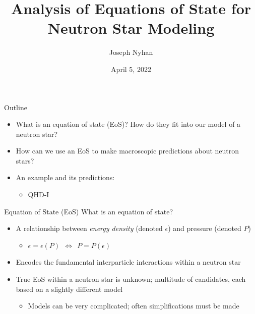 \documentclass[handout]{beamer}
\title[Analysis of Equations of State]{Analysis of Equations of State for Neutron Star Modeling}
\author{Joseph Nyhan}
\date{April 5, 2022}
\institute{College of the Holy Cross}
\begin{document}
    \maketitle

    \begin{frame}{Outline}
        \pause
        \begin{itemize}
            \item What is an equation of state (EoS)? \pause How do they fit into our model of a neutron star? \pause
            \item How can we use an EoS to make macroscopic predictions about neutron stars? \pause
            \item An example and its predictions: \pause
            \begin{itemize}
                \item QHD-I
            \end{itemize}
        \end{itemize}
    \end{frame}

    \begin{frame}{Equation of State (EoS)}
        What is an equation of state? \pause
        \begin{itemize}
            \item A relationship between \textit{energy density} (denoted $\epsilon$) \pause and pressure (denoted $P$) \pause \begin{itemize}
                \item $\epsilon = \epsilon (P)$\pause $~~ \Leftrightarrow ~~  P = P(\epsilon)$ \pause
            \end{itemize}
            \item Encodes the fundamental interparticle interactions within a neutron star \pause
            \item True EoS within a neutron star is unknown; \pause multitude of candidates, each based on a slightly different model \pause \begin{itemize}
                \item Models can be very complicated\pause ; often simplifications must be made
            \end{itemize}

        \end{itemize}
    \end{frame}

\end{document}
